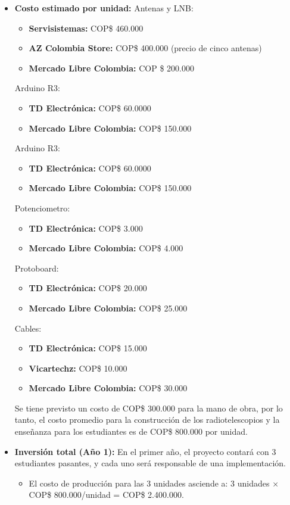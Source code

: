 \begin{itemize}
  \item \textbf{Costo estimado por unidad:}
    Antenas y LNB:
    \begin{itemize}
      \item \textbf{Servisistemas:} COP\$ 460.000
      \item \textbf{AZ Colombia Store:} COP\$ 400.000 (precio de cinco antenas)
      \item \textbf{{Mercado Libre Colombia:}} COP \$ 200.000
    \end{itemize}
    Arduino R3:
    \begin{itemize}
      \item \textbf{TD Electrónica:} COP\$ 60.0000
      \item \textbf{Mercado Libre Colombia:} COP\$ 150.000
    \end{itemize}
    Arduino R3:
    \begin{itemize}
      \item \textbf{TD Electrónica:} COP\$ 60.0000
      \item \textbf{Mercado Libre Colombia:} COP\$ 150.000
    \end{itemize}
    Potenciometro:
    \begin{itemize}
      \item \textbf{TD Electrónica:} COP\$ 3.000
      \item \textbf{Mercado Libre Colombia:} COP\$ 4.000
    \end{itemize}
    Protoboard:
    \begin{itemize}
      \item \textbf{TD Electrónica:} COP\$ 20.000
      \item \textbf{Mercado Libre Colombia:} COP\$ 25.000
    \end{itemize}
    Cables:
    \begin{itemize}
      \item \textbf{TD Electrónica:} COP\$ 15.000
      \item \textbf{Vicartechz:} COP\$ 10.000
      \item \textbf{Mercado Libre Colombia:} COP\$ 30.000
    \end{itemize}

    Se tiene previsto un costo de COP\$ 300.000 para la mano de obra, por lo
    tanto, el costo promedio para la construcción de los radiotelescopios y la
    enseñanza para los estudiantes es de COP\$ 800.000 por unidad.

  \item \textbf{Inversión total (Año 1):} En el primer año, el proyecto
    contará con 3 estudiantes pasantes, y cada uno será responsable de una
    implementación.
    \begin{itemize}
      \item El costo de producción para las 3 unidades asciende a:
        3 unidades $\times$ COP\$ 800.000/unidad = COP\$ 2.400.000.
    \end{itemize}
\end{itemize}

